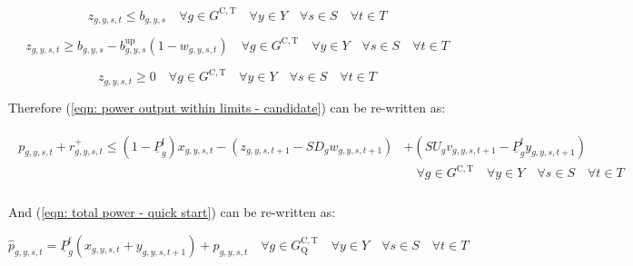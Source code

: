 \documentclass{article}
\newcommand{\sGeneratorsCandidateThermal}{G^{\mathrm{C,T}}}
\newcommand{\sYears}{Y}
\newcommand{\sScenarios}{S}
\newcommand{\sIntervals}{T}
\newcommand{\sGeneratorsCandidateThermalQuickStart}{G^{\mathrm{C,T}}_\mathrm{Q}}
\newcommand{\iGenerator}{g}
\newcommand{\iYear}{y}
\newcommand{\iScenario}{s}
\newcommand{\iInterval}{t}
\newcommand{\cPowerOutputMin}[1][\iGenerator]{\underline{P}_{#1}}
\newcommand{\cPowerOutputMinProportion}{\cPowerOutputMin^{\mathrm{f}}}
\newcommand{\cRampRateStartup}[1][\iGenerator]{SU_{#1}}
\newcommand{\cRampRateShutdown}[1][\iGenerator]{SD_{#1}}
\newcommand{\vStartupIndicator}[1][\iGenerator,\iYear,\iScenario,\iInterval]{v_{#1}}
\newcommand{\vShutdownIndicator}[1][\iGenerator,\iYear,\iScenario,\iInterval]{w_{#1}}
\newcommand{\vReserveUp}[1][\iGenerator,\iYear,\iScenario,\iInterval]{r^{+}_{#1}}
\newcommand{\vPower}[1][\iGenerator,\iYear,\iScenario,\iInterval]{p_{#1}}
\newcommand{\vPowerTotal}[1][\iGenerator,\iYear,\iScenario,\iInterval]{\hat{p}_{#1}}
\newcommand{\vInstalledCapacityTotalScenario}[1][\iGenerator,\iYear,\iScenario]{b_{#1}}
\newcommand{\vInstalledCapacityOnStateAux}[1][\iGenerator,\iYear,\iScenario,\iInterval]{x_{#1}}
\newcommand{\vInstalledCapacityStartupStateAux}[1][\iGenerator,\iYear,\iScenario,\iInterval]{y_{#1}}
\newcommand{\vInstalledCapacityShutdownStateAux}[1][\iGenerator,\iYear,\iScenario,\iInterval]{z_{#1}}
\begin{document}
\begin{equation}
\vInstalledCapacityShutdownStateAux \leq \vInstalledCapacityTotalScenario \quad \forall \iGenerator \in \sGeneratorsCandidateThermal \quad \forall \iYear \in \sYears \quad \forall \iScenario \in \sScenarios \quad \forall \iInterval \in \sIntervals
\end{equation}

\begin{equation}
\vInstalledCapacityShutdownStateAux \geq \vInstalledCapacityTotalScenario - \vInstalledCapacityTotalScenario^{\mathrm{up}} \left(1 - \vShutdownIndicator \right) \quad \forall \iGenerator \in \sGeneratorsCandidateThermal \quad \forall \iYear \in \sYears \quad \forall \iScenario \in \sScenarios \quad \forall \iInterval \in \sIntervals
\end{equation}

\begin{equation}
\vInstalledCapacityShutdownStateAux \geq 0 \quad \forall \iGenerator \in \sGeneratorsCandidateThermal \quad \forall \iYear \in \sYears \quad \forall \iScenario \in \sScenarios \quad \forall \iInterval \in \sIntervals
\label{eqn: shutdown state aux variable block end}
\end{equation}

Therefore (\ref{eqn: power output within limits - candidate}) can be re-written as:

\begin{align}
\begin{split}
\vPower + \vReserveUp \leq \left(1 - \cPowerOutputMinProportion\right) \vInstalledCapacityOnStateAux - \left(\vInstalledCapacityShutdownStateAux[\iGenerator,\iYear,\iScenario,\iInterval+1] -\cRampRateShutdown \vShutdownIndicator[\iGenerator,\iYear,\iScenario,\iInterval+1] \right) & + \left(\cRampRateStartup \vStartupIndicator[\iGenerator,\iYear,\iScenario,\iInterval+1] - \cPowerOutputMinProportion \vInstalledCapacityStartupStateAux[\iGenerator,\iYear,\iScenario,\iInterval+1] \right)\\
& \quad \forall \iGenerator \in \sGeneratorsCandidateThermal \quad \forall \iYear \in \sYears \quad \forall \iScenario \in \sScenarios \quad \forall \iInterval \in \sIntervals\\
\end{split}
\end{align}

And (\ref{eqn: total power - quick start}) can be re-written as:

\begin{equation}
\vPowerTotal = \cPowerOutputMinProportion \left(\vInstalledCapacityOnStateAux + \vInstalledCapacityStartupStateAux[\iGenerator,\iYear,\iScenario,\iInterval+1]\right) + \vPower \quad \forall \iGenerator \in \sGeneratorsCandidateThermalQuickStart \quad \forall \iYear \in \sYears \quad \forall \iScenario \in \sScenarios \quad \forall \iInterval \in \sIntervals
\end{equation}
\end{document}
